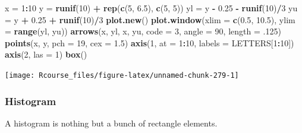 \documentclass[]{book}
\newenvironment{Shaded}{\begin{snugshade}}{\end{snugshade}}
\newcommand{\KeywordTok}[1]{\textcolor[rgb]{0.13,0.29,0.53}{\textbf{#1}}}
\newcommand{\DataTypeTok}[1]{\textcolor[rgb]{0.13,0.29,0.53}{#1}}
\newcommand{\DecValTok}[1]{\textcolor[rgb]{0.00,0.00,0.81}{#1}}
\newcommand{\FloatTok}[1]{\textcolor[rgb]{0.00,0.00,0.81}{#1}}
\newcommand{\StringTok}[1]{\textcolor[rgb]{0.31,0.60,0.02}{#1}}
\newcommand{\OperatorTok}[1]{\textcolor[rgb]{0.81,0.36,0.00}{\textbf{#1}}}
\newcommand{\NormalTok}[1]{#1}
\theoremstyle{definition}
\theoremstyle{definition}
\theoremstyle{definition}
\theoremstyle{remark}
\begin{document}
\begin{Shaded}
\begin{Highlighting}[]
\NormalTok{x =}\StringTok{ }\DecValTok{1}\OperatorTok{:}\DecValTok{10}
\NormalTok{y =}\StringTok{ }\KeywordTok{runif}\NormalTok{(}\DecValTok{10}\NormalTok{) }\OperatorTok{+}\StringTok{ }\KeywordTok{rep}\NormalTok{(}\KeywordTok{c}\NormalTok{(}\DecValTok{5}\NormalTok{, }\FloatTok{6.5}\NormalTok{), }\KeywordTok{c}\NormalTok{(}\DecValTok{5}\NormalTok{, }\DecValTok{5}\NormalTok{))}
\NormalTok{yl =}\StringTok{ }\NormalTok{y }\OperatorTok{-}\StringTok{ }\FloatTok{0.25} \OperatorTok{-}\StringTok{ }\KeywordTok{runif}\NormalTok{(}\DecValTok{10}\NormalTok{)}\OperatorTok{/}\DecValTok{3}
\NormalTok{yu =}\StringTok{ }\NormalTok{y }\OperatorTok{+}\StringTok{ }\FloatTok{0.25} \OperatorTok{+}\StringTok{ }\KeywordTok{runif}\NormalTok{(}\DecValTok{10}\NormalTok{)}\OperatorTok{/}\DecValTok{3}
\KeywordTok{plot.new}\NormalTok{()}
\KeywordTok{plot.window}\NormalTok{(}\DataTypeTok{xlim =} \KeywordTok{c}\NormalTok{(}\FloatTok{0.5}\NormalTok{, }\FloatTok{10.5}\NormalTok{), }\DataTypeTok{ylim =} \KeywordTok{range}\NormalTok{(yl, yu))}
\KeywordTok{arrows}\NormalTok{(x, yl, x, yu, }\DataTypeTok{code =} \DecValTok{3}\NormalTok{, }\DataTypeTok{angle =} \DecValTok{90}\NormalTok{, }\DataTypeTok{length =}\NormalTok{ .}\DecValTok{125}\NormalTok{)}
\KeywordTok{points}\NormalTok{(x, y, }\DataTypeTok{pch =} \DecValTok{19}\NormalTok{, }\DataTypeTok{cex =} \FloatTok{1.5}\NormalTok{)}
\KeywordTok{axis}\NormalTok{(}\DecValTok{1}\NormalTok{, }\DataTypeTok{at =} \DecValTok{1}\OperatorTok{:}\DecValTok{10}\NormalTok{, }\DataTypeTok{labels =}\NormalTok{ LETTERS[}\DecValTok{1}\OperatorTok{:}\DecValTok{10}\NormalTok{])}
\KeywordTok{axis}\NormalTok{(}\DecValTok{2}\NormalTok{, }\DataTypeTok{las =} \DecValTok{1}\NormalTok{)}
\KeywordTok{box}\NormalTok{()}
\end{Highlighting}
\end{Shaded}

\texttt{[image: Rcourse\_files/figure-latex/unnamed-chunk-279-1]}

\subsubsection{Histogram}\label{histogram}

A histogram is nothing but a bunch of rectangle elements.
\end{document}
